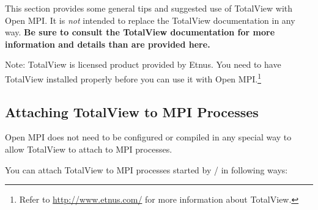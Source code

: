 This section provides some general tips and suggested use of TotalView
with Open MPI.  It is {\em not} intended to replace the TotalView
documentation in any way.  {\bf Be sure to consult the TotalView
  documentation for more information and details than are provided
  here.}

Note: TotalView is licensed product provided by Etnus. You need to
have TotalView installed properly before you can use it with Open
MPI.\footnote{Refer to \url{http://www.etnus.com/} for more
  information about TotalView.}


\subsection{Attaching TotalView to MPI Processes}

Open MPI does not need to be configured or compiled in any special way
to allow TotalView to attach to MPI processes.

You can attach TotalView to MPI processes started by  /
 in following ways:

